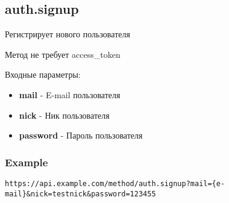 \subsection{auth.signup}
Регистрирует нового пользователя

Метод не требует access\_token

Входные параметры:
\begin{itemize}
  \item \textbf{mail} - E-mail пользователя
  \item \textbf{nick} - Ник пользователя
  \item \textbf{password} - Пароль пользователя
\end{itemize}

\subsubsection{Example}
\begin{Verbatim}[frame=single]
https://api.example.com/method/auth.signup?mail={e-mail}&nick=testnick&password=123455
\end{Verbatim}